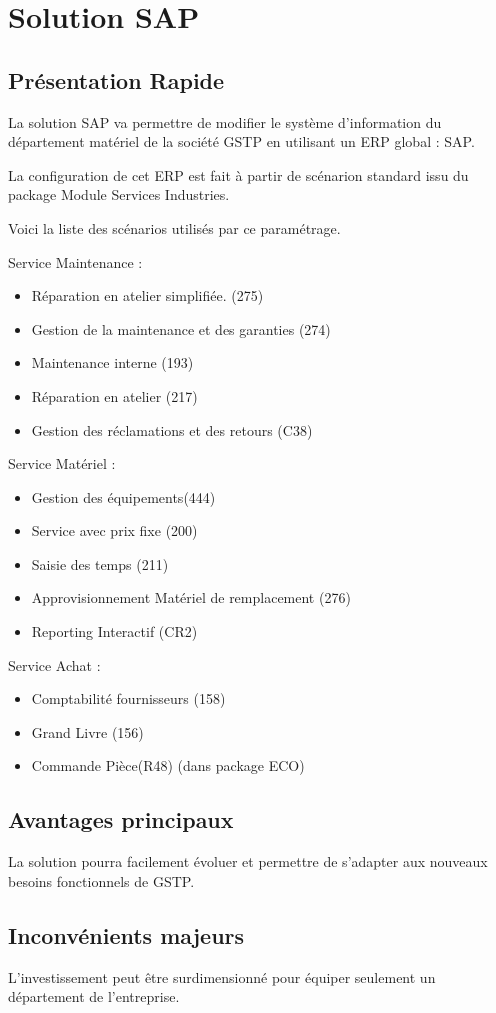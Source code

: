 \section{Solution SAP}

\subsection{Présentation Rapide}

La solution SAP va permettre de modifier le système d'information du département
matériel de la société GSTP en utilisant un ERP global : SAP.

La configuration de cet ERP est fait à partir de scénarion standard issu du package
Module Services Industries.

Voici la liste des scénarios utilisés par ce paramétrage.

Service Maintenance : \\
\begin{itemize}
    \item Réparation en atelier simplifiée. (275)
    \item Gestion de la maintenance et des garanties (274)
    \item Maintenance interne (193)
    \item Réparation en atelier (217)
    \item Gestion des réclamations et des retours (C38)
\end{itemize}

Service Matériel : \\
\begin{itemize}
    \item Gestion des équipements(444)
    \item Service avec prix fixe (200)
    \item Saisie des temps (211)
    \item Approvisionnement Matériel de remplacement (276)
    \item Reporting Interactif (CR2)
\end{itemize}
Service Achat : \\
\begin{itemize}
    \item Comptabilité fournisseurs (158)
    \item Grand Livre (156)
    \item Commande Pièce(R48) (dans package ECO)
\end{itemize}

\subsection{Avantages principaux}

La solution pourra facilement évoluer et permettre de s'adapter aux nouveaux besoins
fonctionnels de GSTP.


\subsection{Inconvénients majeurs}

L'investissement peut être surdimensionné pour équiper seulement un département
de l'entreprise.
